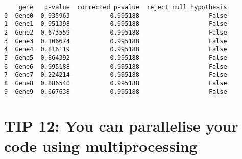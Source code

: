 \documentclass[
  letterpaper,
  DIV=11,
  numbers=noendperiod]{scrartcl}
\begin{document}
\begin{verbatim}
    gene   p-value  corrected p-value  reject null hypothesis
0  Gene0  0.935963           0.995188                   False
1  Gene1  0.951398           0.995188                   False
2  Gene2  0.673559           0.995188                   False
3  Gene3  0.106674           0.995188                   False
4  Gene4  0.816119           0.995188                   False
5  Gene5  0.864392           0.995188                   False
6  Gene6  0.995188           0.995188                   False
7  Gene7  0.224214           0.995188                   False
8  Gene8  0.886540           0.995188                   False
9  Gene9  0.667638           0.995188                   False
\end{verbatim}

\section{TIP 12: You can parallelise your code using
multiprocessing}\label{tip-12-you-can-parallelise-your-code-using-multiprocessing}
\end{document}
